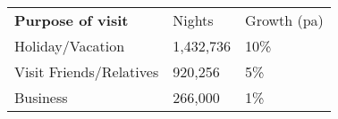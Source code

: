 \begin{tabular}[t]{p{4.8cm}>{\hfill}p{1.3cm}>{\hfill}p{1.4cm}}
 \textbf{Purpose of visit} & Nights & Growth (pa) \\ 
 Holiday/Vacation & 1,432,736 & 10\% \\ 
  Visit Friends/Relatives &   920,256 & 5\% \\ 
  Business &   266,000 & 1\% \\ 
  \end{tabular}
